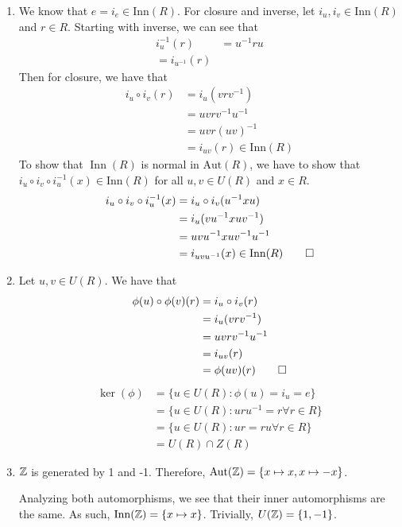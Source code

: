 \documentclass[12pt]{report}
\begin{document}
\begin{enumerate}[label=\alph*.]
    \item We know that $e = i_e \in \text{Inn}(R)$. For closure and inverse, let $i_u, i_v \in \text{Inn}(R)$ and $r \in R$. Starting with inverse, we can see that
    \begin{align*}
        i_u^{-1}(r) &= u^{-1}ru \\
        = i_{u^{-1}}(r)
    \end{align*}
    Then for closure, we have that
    \begin{align*}
        i_u \circ i_v (r) &= i_u(vrv^{-1}) \\
        &= uvrv^{-1}u^{-1}\\
        &= uvr(uv)^{-1} \\
        &= i_{uv}(r) \in \text{Inn}(R)
    \end{align*}
    To show that $\operatorname{Inn}(R)$ is normal in $\text{Aut}(R)$, we have to show that $i_u \circ i_v \circ i_u^{-1} (x) \in \text{Inn}(R)$ for all $u,v \in U(R)$ and $x \in R$. 
    \begin{align*}
        i_u \circ i_v \circ i_u^{-1} (x) &= i_u \circ i_v (u^{-1}xu)\\
        &= i_u(vu^{-1}xuv^{-1}) \\
        &= uvu^{-1} x uv^{-1}u^{-1} \\
        &= i_{uvu^{-1}}(x) \in \text{Inn}(R) \qed
    \end{align*}
    \item Let $u,v \in U(R)$. We have that
    \begin{align*}
        \phi(u)\circ\phi(v)(r) &= i_u \circ i_v (r)\\
        &= i_u(vrv^{-1}) \\
        &= uvrv^{-1}u^{-1} \\
        &= i_{uv}(r)  \\
        &= \phi(uv)(r) \qed\\
    \end{align*}
    \begin{align*}
        \ker(\phi) &= \{ u \in U(R) : \phi (u) = i_u = e\} \\
        &= \{u \in U(R) : uru^{-1} = r \forall r \in R\} \\
        &= \{u \in U(R) : ur = ru \forall r \in R\} \\
        &= U(R) \cap Z(R)
    \end{align*}
    \item $\ZZ$ is generated by 1 and -1. Therefore, $\operatorname{Aut}(\ZZ) = \{x\mapsto x, x\mapsto -x\}$.

    Analyzing both automorphisms, we see that their inner automorphisms are the same. As such, $\operatorname{Inn}(\ZZ) = \{x \mapsto x\}$. Trivially, ${U}(\ZZ) = \{1, -1\}$.
\end{enumerate}
\end{document}
